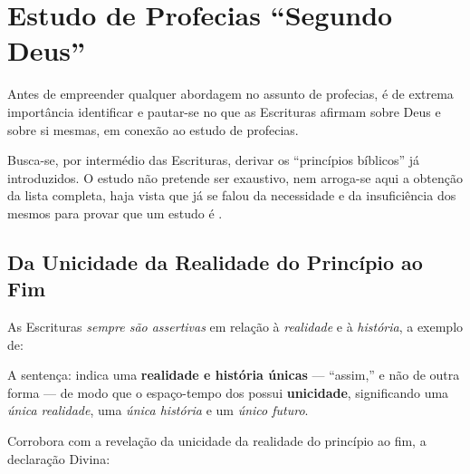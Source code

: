 \section{Estudo de Profecias ``Segundo Deus''}

    Antes de empreender qualquer abordagem no assunto de profecias, é de extrema importância identificar e pautar-se no  que  as
    Escrituras afirmam sobre Deus e sobre si mesmas, em conexão ao estudo de profecias.

    Busca-se, por intermédio das Escrituras, derivar os ``princípios bíblicos'' já  introduzidos.  O  estudo  não  pretende  ser
    exaustivo, nem arroga-se aqui a obtenção da lista completa, haja vista que já se falou da necessidade e da insuficiência dos
    mesmos para provar que um estudo é .


    \subsection{Da Unicidade da Realidade do Princípio ao Fim}

    As Escrituras \emph{sempre são assertivas} em relação à \emph{realidade} e à \emph{história}, a exemplo de:


    A sentença:  indica uma \textbf{realidade e história únicas} --- ``assim,'' e não de outra forma --- de
    modo que o espaço-tempo dos  possui \textbf{unicidade}, significando uma  \emph{única  realidade},  uma
    \emph{única história} e um \emph{único futuro}.

    Corrobora com a revelação da unicidade da realidade do princípio ao fim, a declaração Divina:
        

